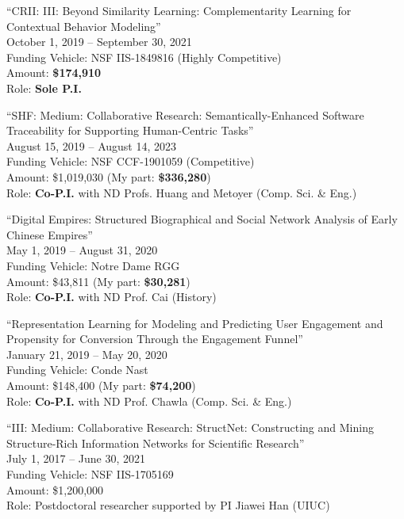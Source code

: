 \documentclass[10pt]{article}
\newenvironment{myindentpar}[1]%
{\begin{list}{}%
         {\setlength{\leftmargin}{#1}}%
         \item[]%
}
{\end{list}}
\newcounter{list}
\begin{document}
\begin{myindentpar}{0.75cm}

\hspace{-0.75cm}``CRII: III: Beyond Similarity Learning: Complementarity Learning for Contextual Behavior Modeling''\\
October 1, 2019 -- September 30, 2021 \\
Funding Vehicle: NSF IIS-1849816 (Highly Competitive) \\
Amount: \textbf{\$174,910} \\
Role: \textbf{Sole P.I.}

\hspace{-0.75cm}``SHF: Medium: Collaborative Research: Semantically-Enhanced Software Traceability for Supporting Human-Centric Tasks''\\
August 15, 2019 -- August 14, 2023 \\
Funding Vehicle: NSF CCF-1901059 (Competitive) \\
Amount: \$1,019,030 (My part: \textbf{\$336,280}) \\
Role: \textbf{Co-P.I.} with ND Profs. Huang and Metoyer (Comp. Sci. \& Eng.)

\hspace{-0.75cm}``Digital Empires: Structured Biographical and Social Network Analysis of Early Chinese Empires''\\
May 1, 2019 -- August 31, 2020 \\
Funding Vehicle: Notre Dame RGG \\
Amount: \$43,811 (My part: \textbf{\$30,281}) \\
Role: \textbf{Co-P.I.} with ND Prof. Cai (History)

\hspace{-0.75cm}``Representation Learning for Modeling and Predicting User Engagement and Propensity for Conversion Through the Engagement Funnel''\\
January 21, 2019 -- May 20, 2020 \\
Funding Vehicle: Conde Nast \\
Amount: \$148,400 (My part: \textbf{\$74,200}) \\
Role: \textbf{Co-P.I.} with ND Prof. Chawla (Comp. Sci. \& Eng.)

\hspace{-0.75cm}``III: Medium: Collaborative Research: StructNet: Constructing and Mining Structure-Rich Information Networks for Scientific Research''\\
July 1, 2017 -- June 30, 2021 \\
Funding Vehicle: NSF IIS-1705169 \\
Amount: \$1,200,000 \\
Role: Postdoctoral researcher supported by PI Jiawei Han (UIUC)


\end{myindentpar}
\end{document}
